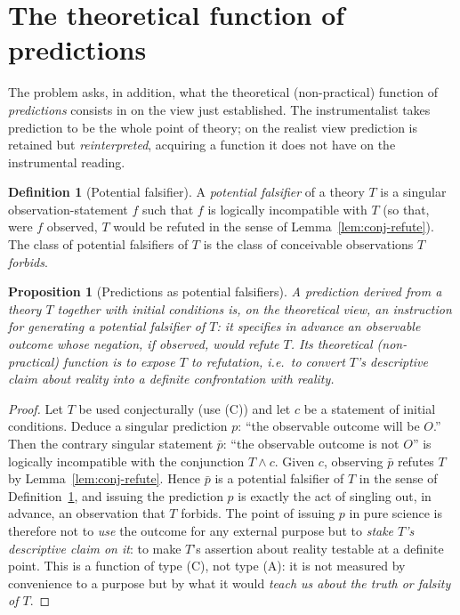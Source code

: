\documentclass{amsart}
\theoremstyle{definition}
\newtheorem{definition}{Definition}
\theoremstyle{plain}
\newtheorem{proposition}{Proposition}
\begin{document}
\section{The theoretical function of predictions}

The problem asks, in addition, what the theoretical (non-practical) function of
\emph{predictions} consists in on the view just established. The instrumentalist
takes prediction to be the whole point of theory; on the realist view
prediction is retained but \emph{reinterpreted}, acquiring a function it does
not have on the instrumental reading.

\begin{definition}[Potential falsifier]\label{def:falsifier}
A \emph{potential falsifier} of a theory $T$ is a singular observation-statement
$f$ such that $f$ is logically incompatible with $T$ (so that, were $f$
observed, $T$ would be refuted in the sense of
Lemma~\ref{lem:conj-refute}). The class of potential falsifiers of $T$ is the
class of conceivable observations $T$ \emph{forbids}.
\end{definition}

\begin{proposition}[Predictions as potential
falsifiers]\label{prop:pred-falsifier}
A prediction derived from a theory $T$ together with initial conditions is, on
the theoretical view, an instruction for generating a potential falsifier of
$T$: it specifies in advance an observable outcome whose \emph{negation}, if
observed, would refute $T$. Its theoretical (non-practical) function is to
\emph{expose $T$ to refutation}, i.e.\ to convert $T$'s descriptive claim about
reality into a definite confrontation with reality.
\end{proposition}

\begin{proof}
Let $T$ be used conjecturally (use (C)) and let $c$ be a statement of initial
conditions. Deduce a singular prediction $p$: ``the observable outcome will be
$O$.'' Then the contrary singular statement $\bar p$: ``the observable outcome
is not $O$'' is logically incompatible with the conjunction $T\wedge c$. Given
$c$, observing $\bar p$ refutes $T$ by Lemma~\ref{lem:conj-refute}. Hence $\bar
p$ is a potential falsifier of $T$ in the sense of
Definition~\ref{def:falsifier}, and issuing the prediction $p$ is exactly the
act of singling out, in advance, an observation that $T$ forbids. The point of
issuing $p$ in pure science is therefore not to \emph{use} the outcome for any
external purpose but to \emph{stake $T$'s descriptive claim on it}: to make
$T$'s assertion about reality testable at a definite point. This is a function
of type (C), not type (A): it is not measured by convenience to a purpose but
by what it would \emph{teach us about the truth or falsity of $T$}.
\end{proof}
\end{document}
